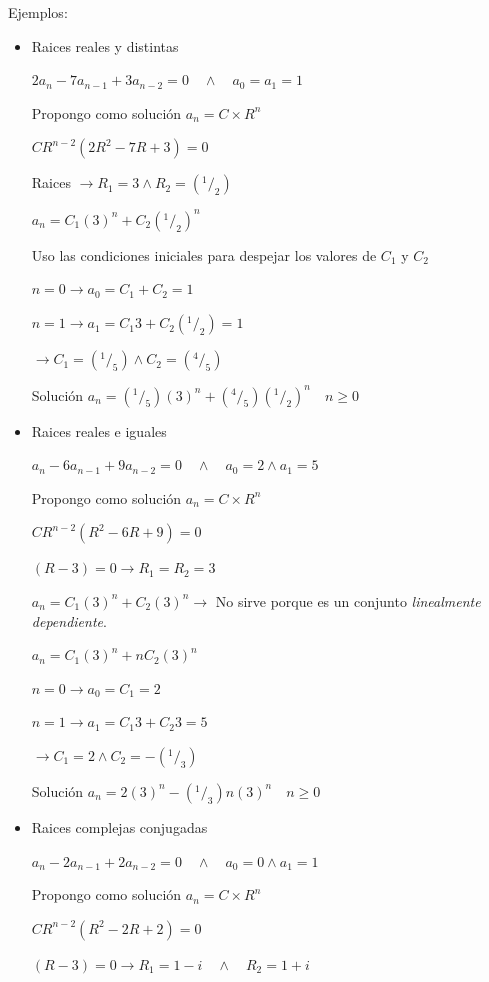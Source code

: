 Ejemplos:
\begin{itemize}
	\item Raices reales y distintas
	
	$2a_n - 7 a_{n-1} + 3 a_{n-2} = 0 \quad \wedge \quad a_0 = a_1 = 1$
	
	Propongo como solución $a_n = C \times R^n$
	
	$C R^{n-2} \left(2R^2 - 7R + 3 \right) = 0$
	
	Raices $\rightarrow R_1 = 3 \wedge R_2 = (^1/_2)$
	
	$a_n = C_1 (3)^n + C_2 (^1/_2)^n$ 
	
	Uso las condiciones iniciales para despejar los valores de $C_1$ y $C_2$
	
	$n=0 \rightarrow a_0 = C_1+C_2 = 1$
	
	$n=1 \rightarrow a_1 = C_1 3+C_2 (^1/_2) = 1$
	
	$\rightarrow C_1 = (^1/_5) \wedge C_2 = (^4/_5)$
	
	Solución $a_n = (^1/_5)(3)^n + (^4/_5)(^1/_2)^n \quad n \geq 0$
	
	\item Raices reales e iguales
	
	$a_n - 6 a_{n-1} + 9 a_{n-2} = 0 \quad \wedge \quad a_0 = 2 \wedge a_1 = 5$
	
	Propongo como solución $a_n = C \times R^n$
	
	$C R^{n-2} \left(R^2 - 6R + 9 \right) = 0$
	
	$\left(R - 3 \right) = 0 \rightarrow R_1=R_2=3$
	
	$a_n= C_1 (3)^n + C_2 (3)^n \rightarrow$ No sirve porque es un conjunto \emph{linealmente dependiente}.
	
	$a_n = C_1 (3)^n + n C_2 (3)^n$
	
	$n=0 \rightarrow a_0 = C_1 = 2$
	
	$n=1 \rightarrow a_1 = C_1 3+C_2 3 = 5$
	
	$\rightarrow C_1 = 2 \wedge C_2 =- (^1/_3)$
	
	Solución $a_n = 2(3)^n - (^1/_3)n(3)^n \quad n \geq 0$
	
	\item Raices complejas conjugadas
	
	$a_n - 2 a_{n-1} + 2 a_{n-2} = 0 \quad \wedge \quad a_0 = 0 \wedge a_1 = 1$
	
	Propongo como solución $a_n = C \times R^n$
	
	$C R^{n-2} \left(R^2 - 2 R + 2 \right) = 0$
	
	$\left(R - 3 \right) = 0 \rightarrow R_1=1-i \quad \wedge \quad R_2 =1+i$
	

\end{itemize}
